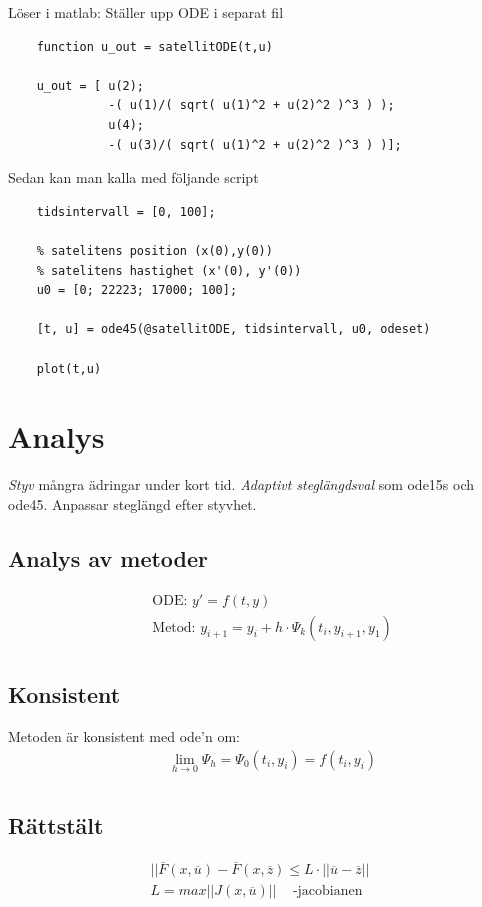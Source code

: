 \documentclass{article}
\begin{document}
Löser i matlab:\newline
Ställer upp ODE i separat fil
\begin{lstlisting}
    function u_out = satellitODE(t,u)

    u_out = [ u(2);
              -( u(1)/( sqrt( u(1)^2 + u(2)^2 )^3 ) );
              u(4);
              -( u(3)/( sqrt( u(1)^2 + u(2)^2 )^3 ) )];
\end{lstlisting}

Sedan kan man kalla med följande script
\begin{lstlisting}
    tidsintervall = [0, 100];
    
    % satelitens position (x(0),y(0))
    % satelitens hastighet (x'(0), y'(0))
    u0 = [0; 22223; 17000; 100];

    [t, u] = ode45(@satellitODE, tidsintervall, u0, odeset)

    plot(t,u)
\end{lstlisting}



\newpage
\section{Analys}
\textit{Styv} mångra ädringar under kort tid.
\textit{Adaptivt steglängdsval} som ode15s och ode45. Anpassar steglängd efter styvhet.

\subsection{Analys av metoder}
\begin{align*}
  &\quad  \text{ODE: } y'=f(t,y) \\
  &\quad  \text{Metod: } y_{i+1} = y_i +h\cdot{\Psi_k}(t_i, y_{i+1}, y_1) \\
\end{align*}

\subsection{Konsistent}
Metoden är konsistent med ode'n om:
\begin{align*}
  &\quad \lim_{h\to0} \Psi_h = \Psi_0(t_i,y_i) = f(t_i,y_i) \\
\end{align*}

\subsection{Rättstält}
\begin{align*}
  || \overline{F}(x,\overline{u})-\overline{F}(x,\overline{z}) \leq L\cdot||\overline{u}-\overline{z}|| \\
  L = max||J(x,\overline{u})|| \;\;\; \text{ -jacobianen}
\end{align*}
\end{document}

